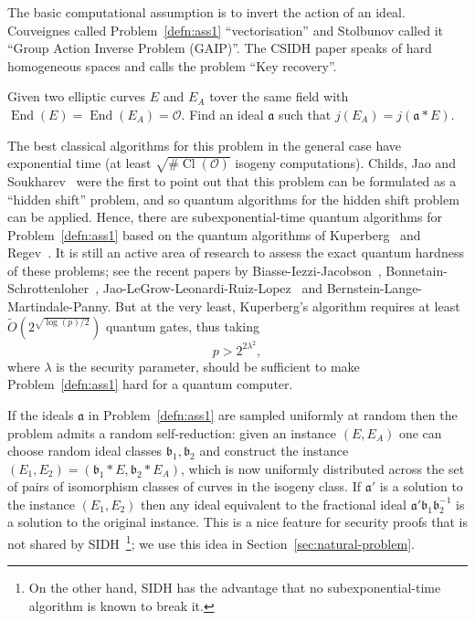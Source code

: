 \documentclass{llncs}
\newcommand{\OO}{\mathcal{O}}
\DeclareMathOperator{\End}{End}
\DeclareMathOperator{\Cl}{Cl}
\renewcommand{\a}{\mathfrak{a}}
\renewcommand{\b}{\mathfrak{b}}
\begin{document}
The basic computational assumption is to invert the action of an ideal.
Couveignes called Problem~\ref{defn:ass1} ``vectorisation'' and Stolbunov called it ``Group Action Inverse Problem (GAIP)''.
The CSIDH paper speaks of hard homogeneous spaces and calls the problem ``Key recovery''.

\begin{problem}\label{defn:ass1}
Given two elliptic curves $E$ and $E_A$ tover the same field with $\End(E) = \End(E_A) = \OO$. Find an ideal $\a$ such that $j( E_A ) = j( \a * E )$.
\end{problem}

The best classical algorithms for this problem in the general case have exponential time (at least $\sqrt{ \# \Cl( \OO ) }$ isogeny computations).
Childs, Jao and Soukharev~\cite{childs2014constructing} were the first to point out that this problem can be formulated as a ``hidden shift'' problem, and so quantum algorithms for the hidden shift problem can be applied.
Hence, there are subexponential-time quantum algorithms for Problem~\ref{defn:ass1} based on the quantum algorithms of Kuperberg~\cite{Kup} and Regev~\cite{regev04}. 
It is still an active area of research to assess the exact quantum hardness of these problems; see the recent papers by Biasse-Iezzi-Jacobson~\cite{BIJ18}, Bonnetain-Schrottenloher~\cite{BS18}, Jao-LeGrow-Leonardi-Ruiz-Lopez~\cite{JLGLRL18} and Bernstein-Lange-Martindale-Panny\cite{cryptoeprint:2018:1059}.
But at the very least, Kuperberg's algorithm requires at least $\tilde{O}( 2^{\sqrt{\log(p)/2}} )$ quantum gates, thus taking 
\begin{equation} \label{con1}
   p>2^{2\lambda^2},
\end{equation}
where $\lambda$ is the security parameter,
should be sufficient to make Problem~\ref{defn:ass1} hard for a quantum computer.


If the ideals $\a$ in Problem~\ref{defn:ass1} are sampled uniformly at random then the problem admits a random self-reduction: given an instance $(E, E_A)$ one can choose random ideal classes $\b_1, \b_2$ and construct the instance $(E_1, E_2) = (\b_1 * E, \b_2 * E_A )$, which is now uniformly distributed across the set of pairs of isomorphism classes of curves in the isogeny class.
If $\a'$ is a solution to the instance $(E_1, E_2)$ then any ideal equivalent to the fractional ideal $\a'\b_1 \b_2^{-1}$ is a solution to the original instance.
This is a nice feature for security proofs that is not shared by SIDH~\cite{JDF2011}\footnote{On the other hand, SIDH has the advantage that no subexponential-time algorithm is known to break it.}; we use this idea in Section~\ref{sec:natural-problem}.
\end{document}
